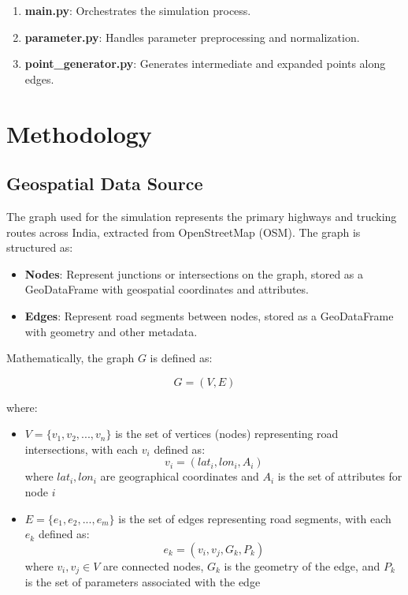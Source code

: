 \documentclass[a4paper,UKenglish,cleveref, autoref, thm-restate]{lipics-v2021}
\begin{document}
\begin{enumerate}
    \item \textbf{main.py}: Orchestrates the simulation process.
    \item \textbf{parameter.py}: Handles parameter preprocessing and normalization.
    \item \textbf{point\_generator.py}: Generates intermediate and expanded points along edges.
\end{enumerate}

\section{Methodology}

\subsection{Geospatial Data Source}
The graph used for the simulation represents the primary highways and trucking routes across India, extracted from OpenStreetMap (OSM). The graph is structured as:

\begin{itemize}
    \item \textbf{Nodes}: Represent junctions or intersections on the graph, stored as a GeoDataFrame with geospatial coordinates and attributes.
    \item \textbf{Edges}: Represent road segments between nodes, stored as a GeoDataFrame with geometry and other metadata.
\end{itemize}

Mathematically, the graph $G$ is defined as:

\[G = (V, E)\]

where:
\begin{itemize}
    \item $V = \{v_1, v_2, ..., v_n\}$ is the set of vertices (nodes) representing road intersections, with each $v_i$ defined as:
    \[v_i = (lat_i, lon_i, A_i)\]
    where $lat_i, lon_i$ are geographical coordinates and $A_i$ is the set of attributes for node $i$
    
    \item $E = \{e_1, e_2, ..., e_m\}$ is the set of edges representing road segments, with each $e_k$ defined as:
    \[e_k = (v_i, v_j, G_k, P_k)\]
    where $v_i, v_j \in V$ are connected nodes, $G_k$ is the geometry of the edge, and $P_k$ is the set of parameters associated with the edge
\end{itemize}
\end{document}
